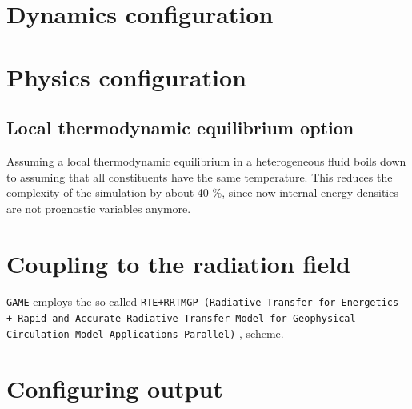\documentclass[10pt]{report}
\begin{document}
\section{Dynamics configuration}
\label{sec:dynamics_configuration}

\section{Physics configuration}
\label{sec:physics_configuration}

\subsection{Local thermodynamic equilibrium option}
\label{sec:local_thermodynamic_equilibrium_option}

Assuming a local thermodynamic equilibrium in a heterogeneous fluid boils down to assuming that all constituents have the same temperature. This reduces the complexity of the simulation by about 40 \%, since now internal energy densities are not prognostic variables anymore.

\section{Coupling to the radiation field}
\label{sec:coupling_to_the_radiation_field}

\texttt{GAME} employs the so-called \texttt{RTE+RRTMGP (Radiative Transfer for Energetics + Rapid and Accurate Radiative Transfer Model for Geophysical Circulation Model Applications—Parallel)} \cite{doi:10.1029/2019MS001621}, \cite{rte-rrtmgp-github} scheme.

\section{Configuring output}
\label{sec:configuring_output}

\appendix

\printbibliography
\end{document}
